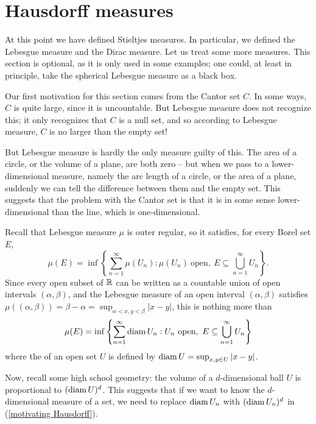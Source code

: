 \section{Hausdorff measures}
At this point we have defined Stieltjes measures.
In particular, we defined the Lebesgue measure and the Dirac measure.
Let us treat some more measures. This section is optional, as it is only used in some examples; one could, at least in principle, take the spherical Lebesgue measure as a black box.

Our first motivation for this section comes from the Cantor set $C$.
In some ways, $C$ is quite large, since it is uncountable. But Lebesgue measure does not recognize this; it only recognizes that $C$ is a null set, and so according to Lebesgue measure, $C$ is no larger than the empty set!

But Lebesgue measure is hardly the only measure guilty of this. The area of a circle, or the volume of a plane, are both zero -- but when we pass to a lower-dimensional measure, namely the arc length of a circle, or the area of a plane, suddenly we can tell the difference between them and the empty set.
This suggests that the problem with the Cantor set is that it is in some sense lower-dimensional than the line, which is one-dimensional.

\begin{subsec}
Recall that Lebesgue measure $\mu$ is outer regular, so it satisfies, for every Borel set $E$,
$$\mu(E) = \inf\left\{\sum_{n=1}^\infty \mu(U_n): \mu(U_{n})~\text{open},~E \subseteq \bigcup_{n=1}^\infty U_{n}\right\}.$$
Since every open subset of $\mathbb{R}$ can be written as a countable union of open intervals $(\alpha, \beta)$, and the Lebesgue measure of an open interval $(\alpha, \beta)$ satisfies $\mu((\alpha, \beta)) = \beta - \alpha = \sup_{\alpha < x,y < \beta} |x - y|$, this is nothing more than
\begin{equation}
\label{motivating Hausdorff}
\mu(E) = \inf\left\{\sum_{n=1}^\infty \operatorname{diam} U_{n}: U_{n}~\text{open},~E \subseteq \bigcup_{n=1}^\infty U_{n}\right\}
\end{equation}
where the  of an open set $U$ is defined by $\operatorname{diam} U = \sup_{x,y \in U} |x - y|$.

Now, recall some high school geometry: the volume of a $d$-dimensional ball $U$ is proportional to $(\operatorname{diam} U)^{d}$.
This suggests that if we want to know the $d$-dimensional measure of a set, we need to replace $\operatorname{diam} U_{n}$ with $(\operatorname{diam} U_{n})^{d}$ in (\ref{motivating Hausdorff}).
\end{subsec}

